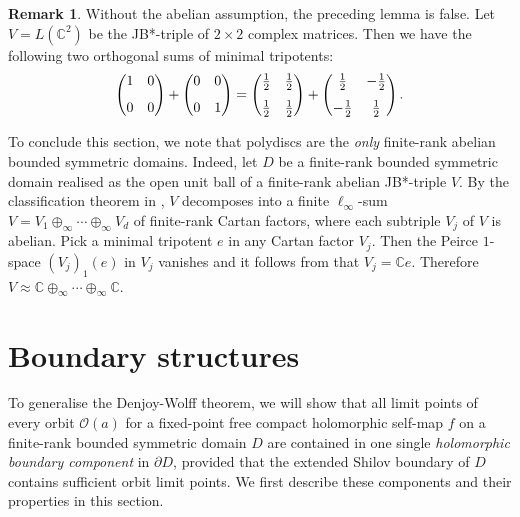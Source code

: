 \documentclass[12pt, twoside]{article}
\theoremstyle{definition}
\newtheorem*{xrem}{Remark}
\numberwithin{equation}{section}
\begin{document}
\begin{xrem} Without the abelian assumption, the preceding lemma is false. Let $V= L(\mathbb{C}^2)$
be the JB*-triple of $2\times 2$ complex matrices. Then we have the following two orthogonal sums of  minimal
tripotents:
\[ \left(\begin{matrix} 1& 0\vspace{.1in}\\ 0&0 \end{matrix}\right) +
 \left(\begin{matrix} 0& 0\vspace{.1in}\\ 0&1 \end{matrix}\right) =
\left(\begin{matrix} \frac{1}{2}& \frac{1}{2}\vspace{.1in}\\ \frac{1}{2}&\frac{1}{2} \end{matrix}\right) +
\left(\begin{matrix}\frac{1}{2}& -\frac{1}{2}\vspace{.1in}\\ -\frac{1}{2}&\frac{1}{2} \end{matrix}\right). \]
\end{xrem}

To conclude this section, we note that
polydiscs are the {\it only} finite-rank abelian  bounded symmetric domains.
Indeed, let $D$ be a finite-rank bounded symmetric domain realised as the open unit ball of a finite-rank
abelian JB*-triple $V$. By the classification theorem in \cite[Theorem 3.3.5]{book2}, $V$ decomposes into
a finite $\ell_\infty$-sum $V=V_1 \oplus_\infty \cdots \oplus_\infty V_d$ of finite-rank Cartan factors, where
each subtriple $V_j$ of $V$ is abelian.  Pick a minimal
tripotent $e$ in any Cartan factor $V_j$. Then the Peirce $1$-space $(V_j)_1(e)$ in $V_j$ vanishes and it follows
from \cite[p.\,311(Case $0$)]{book2} that $V_j=\mathbb{C}e$.
Therefore $V \approx \mathbb{C}\oplus_\infty \cdots \oplus_\infty \mathbb{C}$.


\section{Boundary structures}

To generalise the Denjoy-Wolff theorem, we will show that all limit points of every
orbit $\mathcal{O}(a)$ for a  fixed-point free compact holomorphic self-map $f$ on a
finite-rank bounded symmetric domain $D$ are
contained in one single {\it holomorphic boundary component} in $\partial D$,
provided that the extended Shilov boundary of $D$ contains sufficient orbit limit points.
We first describe these
components and their properties in this section.
\end{document}
